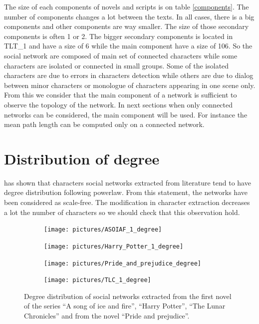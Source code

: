 \documentclass[a4paper, 12pt]{report}
\begin{document}
The size of each components of novels and scripts is on table \ref{components}. The number of components changes a lot between the texts. In all cases, there is a big components and other components are way smaller. The size of those secondary components is often 1 or 2. The bigger secondary components is located in TLT\_1 and have a size of 6 while the main component have a size of 106. So the social network are composed of main set of connected characters while some characters are isolated or connected in small groups. Some of the isolated characters are due to errors in characters detection while others are due to dialog between minor characters or monologue of characters appearing in one scene only. From this we consider that the main component of a network is sufficient to observe the topology of the network. In next sections when only connected networks can be considered, the main component will be used. For instance the mean path length can be computed only on a connected network.

\section{Distribution of degree}
\cite{original} has shown that characters social networks extracted from literature tend to have degree distribution following powerlaw. From this statement, the networks have been considered as scale-free. The modification in character extraction decreases a lot the number of characters so we should check that this observation hold.

\begin{figure}
\begin{subfigure}{.24\textwidth}
\centering
\texttt{[image: pictures/ASOIAF\_1\_degree]}
\end{subfigure}
\hfill
\begin{subfigure}{.24\textwidth}
\centering
\texttt{[image: pictures/Harry\_Potter\_1\_degree]}
\end{subfigure}
\hfill
\begin{subfigure}{.24\textwidth}
\centering
\texttt{[image: pictures/Pride\_and\_prejudice\_degree]}
\end{subfigure}
\begin{subfigure}{.24\textwidth}
\centering
\texttt{[image: pictures/TLC\_1\_degree]}
\end{subfigure}
\caption{Degree distribution of social networks extracted from the first novel of the series ``A song of ice and fire'', ``Harry Potter'', ``The Lunar Chronicles'' and from  the novel ``Pride and prejudice''.}
\label{distrib_degree_4_novels}
\end{figure}
\end{document}
